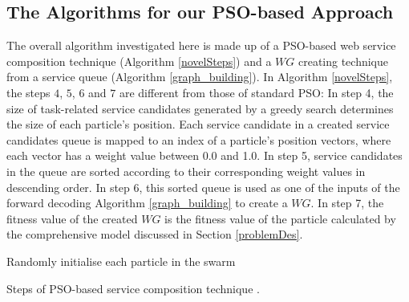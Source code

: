 \subsection{The Algorithms for our PSO-based Approach}\label{PSO-based_algomargin}
The overall algorithm investigated here is made up of a PSO-based web service composition technique (Algorithm \ref{novelSteps}) and a $WG$ creating technique from a service queue (Algorithm \ref{graph_building}). In Algorithm \ref{novelSteps}, the  steps $4$, $5$, $6$ and $7$ are different from those of standard PSO: In step 4, the size of task-related service candidates generated by a greedy search determines the size of each particle's position. Each service candidate in a created service candidates queue is mapped to an index of a particle’s position vectors, where each vector has a weight value between 0.0 and 1.0. In step 5, service candidates in the queue are sorted according to their corresponding weight values in descending order. In step 6, this sorted queue is used as one of the inputs of the forward decoding Algorithm \ref{graph_building} to create a $WG$. In step 7, the fitness value of the created $WG$ is the fitness value of the particle calculated by the comprehensive model discussed in Section \ref{problemDes}.
\begin{algorithm}
 \SetNlSty{}{}{:}
 Randomly initialise each particle in the swarm\;
\caption{Steps of PSO-based service composition technique \cite{da2016particle}.}
\label{novelSteps}
\end{algorithm} 

